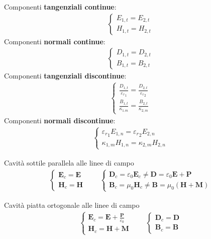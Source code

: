 \documentclass[10pt, twocolumn, a4paper, fleqn]{article}
\def\b{\textbf}
\def\bb{\mathbf}
\def\({\left(}
\def\){\right)}
\def\e{\varepsilon}
\def\ke{{\varepsilon_r}}
\def\E{\bb{E}}
\def\P{\bb{P}}
\def\D{\bb{D}}
\def\B{\bb{B}}
\def\H{\bb{H}}
\def\M{\bb{M}}
\begin{document}
Componenti \b{tangenziali continue}:
\begin{equation*}\begin{split}
\begin{cases}
E_{1,t}=E_{2,t}\\
H_{1,t}=H_{2,t}
\end{cases}
\end{split}\end{equation*}
Componenti \b{normali continue}:
\begin{equation*}\begin{split}
\begin{cases}
D_{1,t}=D_{2,t}\\
B_{1,t}=B_{2,t}
\end{cases}
\end{split}\end{equation*}
Componenti \b{tangenziali discontinue}:
\begin{equation*}\begin{split}
\begin{cases}
\frac{D_{1,t}}{\ke_1}=\frac{D_{2,t}}{\ke_2}\\
\frac{B_{1,t}}{\kappa_{1.m}}=\frac{B_{2,t}}{\kappa_{2,m}}
\end{cases}
\end{split}\end{equation*}
Componenti \b{normali discontinue}:
\begin{equation*}\begin{split}
\begin{cases}
\ke_1 E_{1,n}=\ke_2 E_{2,n}\\
\kappa_{1,m} H_{1,n}=\kappa_{2,m} H_{2,n}
\end{cases}
\end{split}\end{equation*}

Cavità sottile parallela alle linee di campo
\begin{equation*}\begin{split}
\begin{cases}
\E_c=\E\\
\H_c=\H
\end{cases}
\qquad
\begin{cases}
\D_c=\e_0\E_c\neq\D=\e_0\E+\P\\
\B_c=\mu_0\H_c\neq\B=\mu_0\(\H+\M\)
\end{cases}
\end{split}\end{equation*}

Cavità piatta ortogonale alle linee di campo
\begin{equation*}\begin{split}
\begin{cases}
\E_c=\E+\frac{\P}{\e_0}\\
\H_c=\H+\M
\end{cases}
\qquad
\begin{cases}
\D_c=\D\\
\B_c=\B
\end{cases}
\end{split}\end{equation*}
\end{document}
